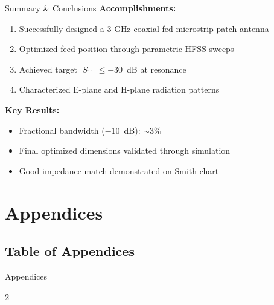 \documentclass[compress,aspectratio=169,10pt]{beamer}
\begin{document}
\begin{frame}{Summary \& Conclusions}
    \textbf{Accomplishments:}
    \begin{enumerate}
        \item Successfully designed a 3-GHz coaxial-fed microstrip patch antenna
        \item Optimized feed position through parametric HFSS sweeps
        \item Achieved target $|S_{11}| \le -30$~dB at resonance
        \item Characterized E-plane and H-plane radiation patterns
    \end{enumerate}

    \vspace{1em}
    \textbf{Key Results:}
    \begin{itemize}
        \item Fractional bandwidth ($-10$~dB): $\sim 3\%$
        \item Final optimized dimensions validated through simulation
        \item Good impedance match demonstrated on Smith chart
    \end{itemize}
\end{frame}


\section[Appendices]{Appendices}

\subsection[Appendix T.o.C.]{Table of Appendices}

\begin{frame}{Appendices}
    \footnotesize
    \begin{multicols}{2}
        \tableofcontents[sectionstyle=show/show,subsectionstyle=show/show,sections={8-11}]
    \end{multicols}
\end{frame}

\end{document}
